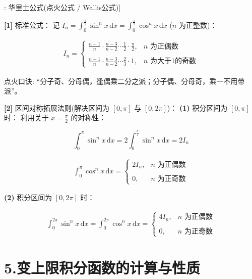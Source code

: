 \documentclass[11pt,a4paper,UTF8]{ctexart}
\begin{document}
\begin{thmbox}[公式[3]: 华里士公式(点火公式 / Wallis公式)]

\textbf{[1]} 标准公式：
记 $I_n = \int_0^{\frac{\pi}{2}} \sin^n x\,\mathrm{d}x = \int_0^{\frac{\pi}{2}} \cos^n x\,\mathrm{d}x$ ($n$ 为正整数)：


\begin{align*}
I_n = \begin{cases} \frac{n-1}{n} \cdot \frac{n-3}{n-2} \cdots \frac{1}{2} \cdot \frac{\pi}{2}, & n \text{ 为正偶数} \\ \\ \frac{n-1}{n} \cdot \frac{n-3}{n-2} \cdots \frac{2}{3} \cdot 1, & n \text{ 为大于1的奇数} \end{cases}
\end{align*}


点火口诀: “分子奇、分母偶，逢偶乘二分之派；分子偶、分母奇，乘一不用带派”。

\textbf{[2]} 区间对称拓展法则(解决区间为 $[0, \pi]$ 与 $[0, 2\pi]$)：
\textbf{(1)}  积分区间为 $[0, \pi]$ 时：
利用关于 $x = \frac{\pi}{2}$ 的对称性：


\begin{equation*}
\int_0^\pi \sin^n x\,\mathrm{d}x = 2\int_0^{\frac{\pi}{2}} \sin^n x\,\mathrm{d}x = 2 I_n
\end{equation*}



\begin{align*}
\int_0^\pi \cos^n x\,\mathrm{d}x = \begin{cases} 2 I_n, & n \text{ 为正偶数} \\ \\ 0, & n \text{ 为正奇数} \end{cases}
\end{align*}


\textbf{(2)}  积分区间为 $[0, 2\pi]$ 时：

\begin{align*}
\int_0^{2\pi} \sin^n x\,\mathrm{d}x = \int_0^{2\pi} \cos^n x\,\mathrm{d}x = \begin{cases} 4 I_n, & n \text{ 为正偶数} \\ \\ 0, & n \text{ 为正奇数} \end{cases}
\end{align*}


\end{thmbox}

\section{5.变上限积分函数的计算与性质}
\end{document}
